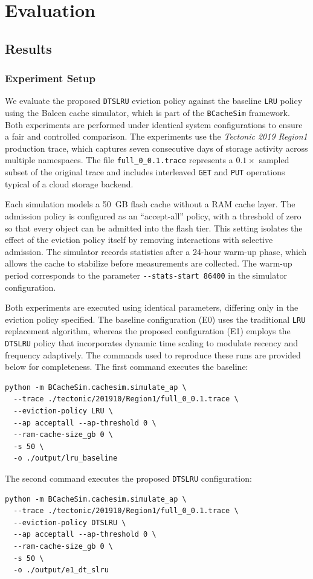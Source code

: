 \section{Evaluation}
\subsection{Results}
\subsubsection{Experiment Setup}
We evaluate the proposed \texttt{DTSLRU} eviction policy against the baseline \texttt{LRU} policy using the Baleen cache simulator, which is part of the \texttt{BCacheSim} framework. Both experiments are performed under identical system configurations to ensure a fair and controlled comparison. The experiments use the \textit{Tectonic 2019 Region1} production trace, which captures seven consecutive days of storage activity across multiple namespaces. The file \verb|full_0_0.1.trace| represents a $0.1\times$ sampled subset of the original trace and includes interleaved \texttt{GET} and \texttt{PUT} operations typical of a cloud storage backend.

Each simulation models a 50~GB flash cache without a RAM cache layer. The admission policy is configured as an ``accept-all'' policy, with a threshold of zero so that every object can be admitted into the flash tier. This setting isolates the effect of the eviction policy itself by removing interactions with selective admission. The simulator records statistics after a 24-hour warm-up phase, which allows the cache to stabilize before measurements are collected. The warm-up period corresponds to the parameter \verb|--stats-start 86400| in the simulator configuration.

Both experiments are executed using identical parameters, differing only in the eviction policy specified. The baseline configuration (E0) uses the traditional \texttt{LRU} replacement algorithm, whereas the proposed configuration (E1) employs the \texttt{DTSLRU} policy that incorporates dynamic time scaling to modulate recency and frequency adaptively. The commands used to reproduce these runs are provided below for completeness. The first command executes the baseline:
\begin{verbatim}
python -m BCacheSim.cachesim.simulate_ap \
  --trace ./tectonic/201910/Region1/full_0_0.1.trace \
  --eviction-policy LRU \
  --ap acceptall --ap-threshold 0 \
  --ram-cache-size_gb 0 \
  -s 50 \
  -o ./output/lru_baseline
\end{verbatim}
The second command executes the proposed \texttt{DTSLRU} configuration:
\begin{verbatim}
python -m BCacheSim.cachesim.simulate_ap \
  --trace ./tectonic/201910/Region1/full_0_0.1.trace \
  --eviction-policy DTSLRU \
  --ap acceptall --ap-threshold 0 \
  --ram-cache-size_gb 0 \
  -s 50 \
  -o ./output/e1_dt_slru
\end{verbatim}

